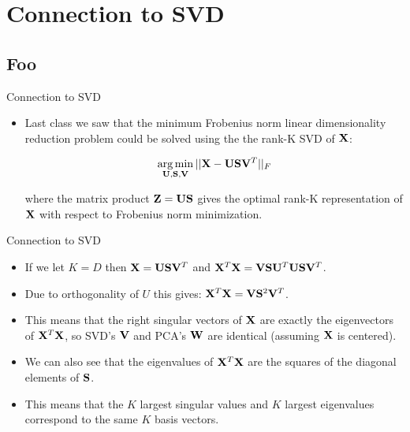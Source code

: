 \documentclass[serif,xcolor=pdftex,dvipsnames,table,hyperref={bookmarks=false,breaklinks}]{beamer}
\begin{document}
\section{Connection to SVD}
\subsection{Foo}

\begin{frame}[t]{Connection to SVD}

\begin{itemize}
\item Last class we saw that the minimum Frobenius norm linear dimensionality 
reduction problem could be solved using the the rank-K SVD of ${\mathbf{X}}$:

$$\operatorname*{arg\,min}_{{\mathbf{U}},{\mathbf{S}},{\mathbf{V}}} ||{\mathbf{X}} - {\mathbf{U}}{\mathbf{S}}{\mathbf{V}}^T ||_F$$

where the matrix product ${\mathbf{Z}}={\mathbf{U}}{\mathbf{S}}$ gives the optimal rank-K 
representation of ${\mathbf{X}}$ with respect to Frobenius norm minimization.  


\end{itemize} 
\end{frame}


\begin{frame}[t]{Connection to SVD}

\begin{itemize}
\item If we let $K=D$ then ${\mathbf{X}} = {\mathbf{U}}{\mathbf{S}}{\mathbf{V}}^T$ and
${\mathbf{X}}^T{\mathbf{X}} = {\mathbf{V}}{\mathbf{S}}{\mathbf{U}}^T{\mathbf{U}}{\mathbf{S}}{\mathbf{V}}^T$.

\pause\item Due to orthogonality of $U$ this gives: ${\mathbf{X}}^T{\mathbf{X}} = 
{\mathbf{V}}{\mathbf{S}}^2{\mathbf{V}}^T$. 

\pause\item This means that the right singular vectors of 
${\mathbf{X}}$ are exactly the eigenvectors of ${\mathbf{X}}^T{\mathbf{X}}$, so 
SVD's ${\mathbf{V}}$ and PCA's ${\mathbf{W}}$ are identical (assuming ${\mathbf{X}}$ is centered). 

\pause\item We can also see that the eigenvalues of ${\mathbf{X}}^T{\mathbf{X}}$ are the 
squares of the diagonal elements of ${\mathbf{S}}$. 

\pause \item This means that the $K$ largest 
singular values and $K$ largest eigenvalues correspond to the same $K$ basis 
vectors.

\end{itemize} 
\end{frame}
\end{document}
